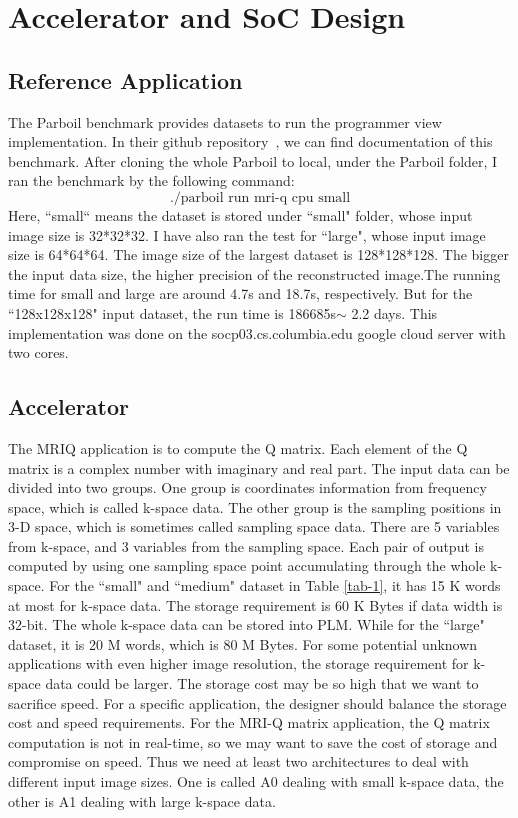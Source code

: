 \section{Accelerator and SoC Design}

\subsection{Reference Application}

The Parboil benchmark provides datasets to run the programmer view
implementation. In their github repository~\cite{Rub1}, we can find
documentation of this benchmark. After cloning the whole Parboil to local, under
the Parboil folder, I ran the benchmark by the following command:
$$\text{./parboil run mri-q cpu small}$$ Here, ``small“ means the dataset is
stored under ``small" folder, whose input image size is 32*32*32. I have also
ran the test for ``large", whose input image size is 64*64*64. The image size of
the largest dataset is 128*128*128.  The bigger the input data size, the higher
precision of the reconstructed image.The running time for small and large are
around 4.7s and 18.7s, respectively. But for the ``128x128x128" input dataset,
the run time is 186685s$ \sim$ 2.2 days. This implementation was done on the
socp03.cs.columbia.edu google cloud server with two cores.

\subsection{Accelerator}

The MRIQ application is to compute the Q matrix. Each element of the Q matrix is
a complex number with imaginary and real part. The input data can be divided
into two groups. One group is coordinates information from frequency space,
which is called k-space data. The other group is the sampling positions in 3-D
space, which is sometimes called sampling space data. There are 5 variables from
k-space, and 3 variables from the sampling space. Each pair of output is
computed by using one sampling space point accumulating through the whole
k-space. For the ``small" and ``medium" dataset in Table \ref{tab-1}, it has 15
K words at most for k-space data. The storage requirement is 60 K Bytes if data
width is 32-bit. The whole k-space data can be stored into PLM. While for the
``large" dataset, it is 20 M words, which is 80 M Bytes. For some potential
unknown applications with even higher image resolution, the storage requirement
for k-space data could be larger. The storage cost may be so high that we want
to sacrifice speed. For a specific application, the designer should balance the
storage cost and speed requirements. For the MRI-Q matrix application, the Q
matrix computation is not in real-time, so we may want to save the cost of
storage and compromise on speed. Thus we need at least two architectures to deal
with different input image sizes. One is called A0 dealing with small k-space
data, the other is A1 dealing with large k-space data.\\



